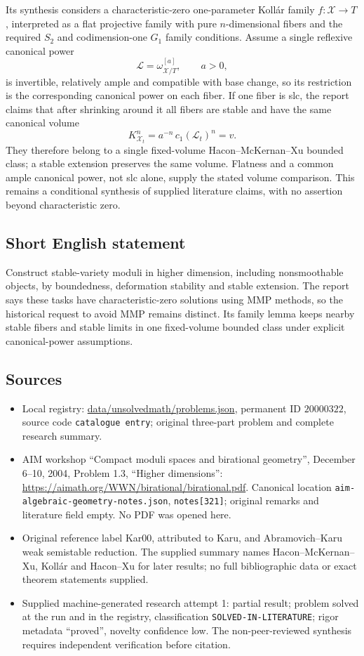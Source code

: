 \documentclass[11pt]{article}
\begin{document}
Its synthesis considers a characteristic-zero one-parameter Koll\'ar family $f:\mathcal X\to T$, interpreted as a flat projective family with pure $n$-dimensional fibers and the required $S_2$ and codimension-one $G_1$ family conditions. Assume a single reflexive canonical power
\[
 \mathcal L=\omega_{\mathcal X/T}^{[a]},\qquad a>0,
\]
is invertible, relatively ample and compatible with base change, so its restriction is the corresponding canonical power on each fiber. If one fiber is slc, the report claims that after shrinking around it all fibers are stable and have the same canonical volume
\[
 K_{\mathcal X_t}^n=a^{-n}\,c_1(\mathcal L_t)^n=v.
\]
They therefore belong to a single fixed-volume Hacon--McKernan--Xu bounded class; a stable extension preserves the same volume. Flatness and a common ample canonical power, not slc alone, supply the stated volume comparison. This remains a conditional synthesis of supplied literature claims, with no assertion beyond characteristic zero.
\subsection{Short English statement}
Construct stable-variety moduli in higher dimension, including nonsmoothable objects, by boundedness, deformation stability and stable extension. The report says these tasks have characteristic-zero solutions using MMP methods, so the historical request to avoid MMP remains distinct. Its family lemma keeps nearby stable fibers and stable limits in one fixed-volume bounded class under explicit canonical-power assumptions.
\subsection{Sources}
\begin{itemize}
\item Local registry: \url{data/unsolvedmath/problems.json}, permanent ID $20000322$, source code \texttt{catalogue entry}; original three-part problem and complete research summary.
\item AIM workshop ``Compact moduli spaces and birational geometry'', December 6--10, 2004, Problem 1.3, ``Higher dimensions'': \url{https://aimath.org/WWN/birational/birational.pdf}. Canonical location \texttt{aim-algebraic-geometry-notes.json}, \texttt{notes[321]}; original remarks and literature field empty. No PDF was opened here.
\item Original reference label Kar00, attributed to Karu, and Abramovich--Karu weak semistable reduction. The supplied summary names Hacon--McKernan--Xu, Koll\'ar and Hacon--Xu for later results; no full bibliographic data or exact theorem statements supplied.
\item Supplied machine-generated research attempt 1: partial result; problem solved at the run and in the registry, classification \texttt{SOLVED-IN-LITERATURE}; rigor metadata ``proved'', novelty confidence low. The non-peer-reviewed synthesis requires independent verification before citation.
\end{itemize}
\end{document}
